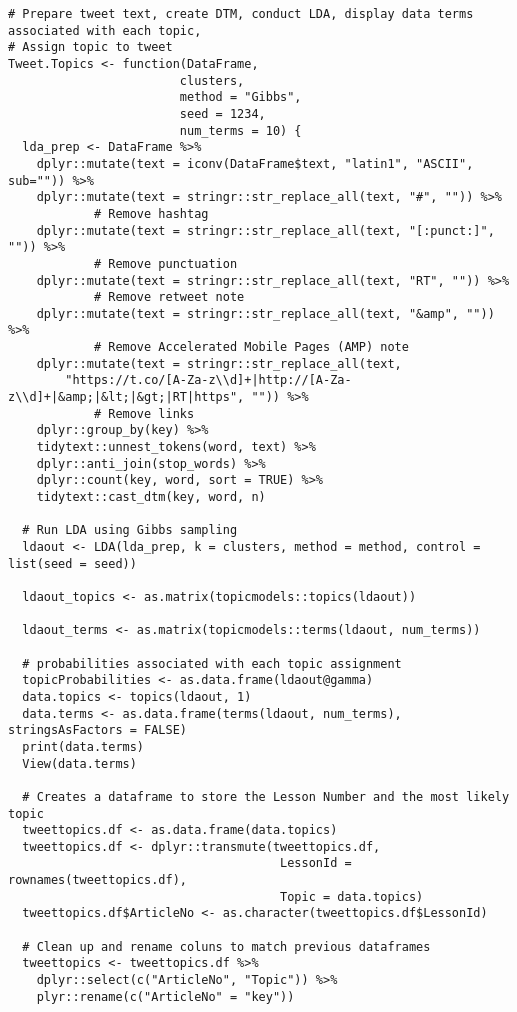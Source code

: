 \begin{lstlisting}
# Prepare tweet text, create DTM, conduct LDA, display data terms associated with each topic, 
# Assign topic to tweet
Tweet.Topics <- function(DataFrame, 
                        clusters, 
                        method = "Gibbs", 
                        seed = 1234, 
                        num_terms = 10) {
  lda_prep <- DataFrame %>% 
    dplyr::mutate(text = iconv(DataFrame$text, "latin1", "ASCII", sub="")) %>% 
    dplyr::mutate(text = stringr::str_replace_all(text, "#", "")) %>% 
    		# Remove hashtag
    dplyr::mutate(text = stringr::str_replace_all(text, "[:punct:]", "")) %>% 
    		# Remove punctuation
    dplyr::mutate(text = stringr::str_replace_all(text, "RT", "")) %>% 
    		# Remove retweet note
    dplyr::mutate(text = stringr::str_replace_all(text, "&amp", "")) %>% 
    		# Remove Accelerated Mobile Pages (AMP) note
    dplyr::mutate(text = stringr::str_replace_all(text, 
    	"https://t.co/[A-Za-z\\d]+|http://[A-Za-z\\d]+|&amp;|&lt;|&gt;|RT|https", "")) %>%  
            # Remove links
    dplyr::group_by(key) %>%
    tidytext::unnest_tokens(word, text) %>% 
    dplyr::anti_join(stop_words) %>% 
    dplyr::count(key, word, sort = TRUE) %>% 
    tidytext::cast_dtm(key, word, n)
  
  # Run LDA using Gibbs sampling
  ldaout <- LDA(lda_prep, k = clusters, method = method, control = list(seed = seed))
  
  ldaout_topics <- as.matrix(topicmodels::topics(ldaout))
  
  ldaout_terms <- as.matrix(topicmodels::terms(ldaout, num_terms))
  
  # probabilities associated with each topic assignment
  topicProbabilities <- as.data.frame(ldaout@gamma)
  data.topics <- topics(ldaout, 1)
  data.terms <- as.data.frame(terms(ldaout, num_terms), stringsAsFactors = FALSE)
  print(data.terms)
  View(data.terms)
  
  # Creates a dataframe to store the Lesson Number and the most likely topic
  tweettopics.df <- as.data.frame(data.topics)
  tweettopics.df <- dplyr::transmute(tweettopics.df, 
                                      LessonId = rownames(tweettopics.df), 
                                      Topic = data.topics)
  tweettopics.df$ArticleNo <- as.character(tweettopics.df$LessonId)
  
  # Clean up and rename coluns to match previous dataframes
  tweettopics <- tweettopics.df %>% 
    dplyr::select(c("ArticleNo", "Topic")) %>% 
    plyr::rename(c("ArticleNo" = "key"))
  

\end{lstlisting}
